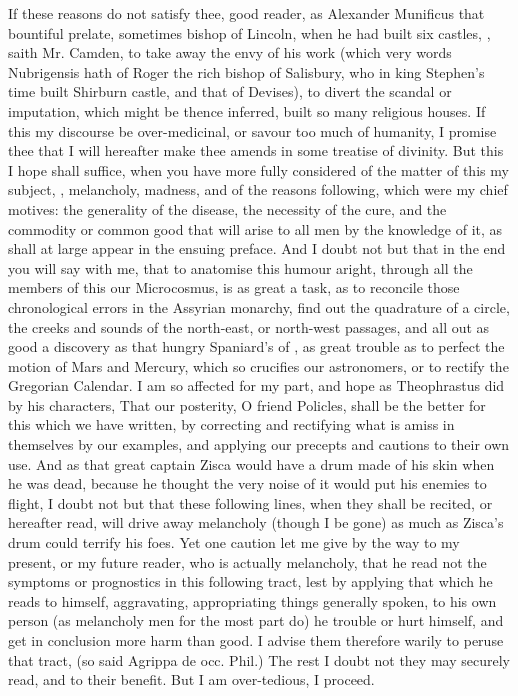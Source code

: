 {If these reasons do not satisfy thee, good reader, as Alexander
Munificus that bountiful prelate, sometimes bishop of Lincoln, when he
had built six castles, , saith Mr.
Camden, to take away the envy of his work (which very words Nubrigensis
hath of Roger the rich bishop of Salisbury, who in king Stephen's time
built Shirburn castle, and that of Devises), to divert the scandal or
imputation, which might be thence inferred, built so many religious
houses. If this my discourse be over-medicinal, or savour too much of
humanity, I promise thee that I will hereafter make thee amends in some
treatise of divinity. But this I hope shall suffice, when you have more
fully considered of the matter of this my subject, ,
melancholy, madness, and of the reasons following, which were my chief
motives: the generality of the disease, the necessity of the cure, and
the commodity or common good that will arise to all men by the
knowledge of it, as shall at large appear in the ensuing preface. And I
doubt not but that in the end you will say with me, that to anatomise
this humour aright, through all the members of this our Microcosmus, is
as great a task, as to reconcile those chronological errors in the
Assyrian monarchy, find out the quadrature of a circle, the creeks and
sounds of the north-east, or north-west passages, and all out as good a
discovery as that hungry Spaniard's of ,
as great trouble as to perfect the motion of Mars and Mercury, which so
crucifies our astronomers, or to rectify the Gregorian Calendar. I am
so affected for my part, and hope as Theophrastus did by his
characters, That our posterity, O friend Policles, shall be the better
for this which we have written, by correcting and rectifying what is
amiss in themselves by our examples, and applying our precepts and
cautions to their own use. And as that great captain Zisca would have a
drum made of his skin when he was dead, because he thought the very
noise of it would put his enemies to flight, I doubt not but that these
following lines, when they shall be recited, or hereafter read, will
drive away melancholy (though I be gone) as much as Zisca's drum could
terrify his foes. Yet one caution let me give by the way to my present,
or my future reader, who is actually melancholy, that he read not the
symptoms or prognostics in this following tract, lest by applying
that which he reads to himself, aggravating, appropriating things
generally spoken, to his own person (as melancholy men for the most
part do) he trouble or hurt himself, and get in conclusion more harm
than good. I advise them therefore warily to peruse that tract,  (so said Agrippa de occ. Phil.)  The rest I doubt not they may securely read, and
to their benefit. But I am over-tedious, I proceed.

}
